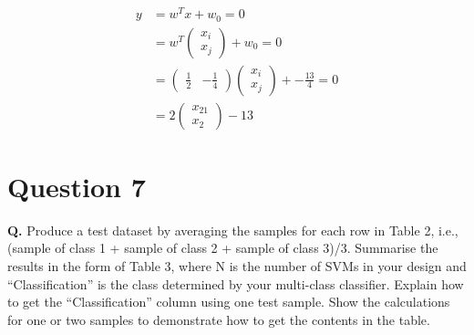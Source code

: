 \documentclass[12pt]{report}
\begin{document}
\begin{equation}
	\begin{aligned}
		y & = w^Tx + w_{0} = 0                                                                                                    \\
		  & = w^T\begin{pmatrix}x_{i}\\x_{j}\end{pmatrix} + w_{0} = 0                                                             \\
		  & = \begin{pmatrix}\frac{1}{2} & -\frac{1}{4}\end{pmatrix}\begin{pmatrix}x_{i} \\x_{j}\end{pmatrix} + -\frac{13}{4} = 0 \\
		  & = 2\begin{pmatrix}x_{21}\\x_{2}\end{pmatrix} - 13
	\end{aligned}
\end{equation}

\pagebreak

\section{Question 7}

\textbf{Q.} Produce a test dataset by averaging the samples for each row in Table 2, i.e., (sample of class 1 + sample of class 2 + sample of class 3)/3. Summarise the results in
the form of Table 3, where N is the number of SVMs in your design and “Classification” is the class determined by your multi-class classifier. Explain how to get
the “Classification” column using one test sample. Show the calculations for one or
two samples to demonstrate how to get the contents in the table.
\end{document}
